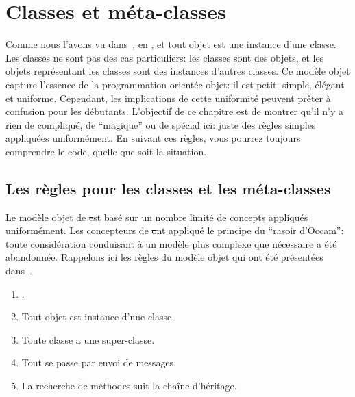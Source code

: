 \documentclass[a4paper,10pt,twoside]{book}
\begin{document}
	\renewcommand{\nnbb}[2]{} %
	\sloppy
\fi
\chapter{Classes et méta-classes}


Comme nous l'avons vu dans~, en \st \mantra, et tout objet est une instance d'une classe.
Les classes ne sont pas des cas particuliers:
les classes sont des objets, et les objets représentant les classes sont des instances d'autres classes.
Ce modèle objet capture l'essence de la programmation orientée objet: il est petit, simple, élégant et uniforme.
Cependant, les implications de cette uniformité peuvent prêter à confusion pour les débutants.
L'objectif de ce chapitre est de montrer qu'il n'y a rien de compliqué, de ``magique'' ou de spécial ici: juste des règles simples appliquées uniformément. 
En suivant ces règles, vous pourrez toujours comprendre le code, quelle que soit la situation.

\section{Les règles pour les classes et les méta-classes}

Le modèle objet de \st est basé sur un nombre limité de concepts appliqués uniformément.
Les concepteurs de \st ont appliqué le principe du ``rasoir d'Occam'': toute considération conduisant à un modèle plus complexe que nécessaire a été abandonnée.
Rappelons ici les règles du modèle objet qui ont été présentées dans~.

\begin{enumerate}[label={\textbf{Règle \arabic{*}}.}, ref={la règle~\arabic{*}}, leftmargin=*, widest=10]
\item{} %
	\Mantra.

\item{} %
	Tout objet est instance d'une classe.

\item{} %
	Toute classe a une super-classe.

\item{} %
	Tout se passe par envoi de messages. 
\item{} %
	La recherche de méthodes suit la chaîne d'héritage.
\end{enumerate}
\end{document}
